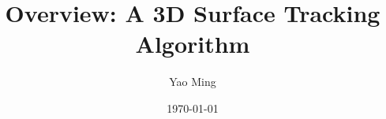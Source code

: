 \documentclass{article}
\begin{document}
\title{Overview: A 3D Surface Tracking Algorithm}
\author{Yao Ming}
\date{\today}
\maketitle
\end{document}
